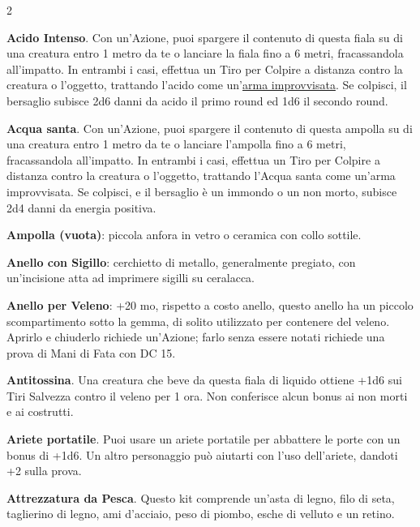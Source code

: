 \begin{multicols}{2}
\medskip

\textbf{Acido Intenso}\label{Acido Intenso}\hypertarget{Acido Intenso}{}. Con un'Azione, puoi spargere il contenuto di questa fiala su di una creatura entro 1 metro da te o lanciare la fiala fino a 6 metri, fracassandola all'impatto. In entrambi i casi, effettua un Tiro per Colpire a distanza contro la creatura o l'oggetto, trattando l'acido come un'\hyperlink{armaimprovvisata}{arma improvvisata}. Se colpisci, il bersaglio subisce 2d6 danni da acido il primo round ed 1d6 il secondo round.

\textbf{Acqua santa}\label{Acqua santa}\hypertarget{Acqua santa}{}. Con un'Azione, puoi spargere il contenuto di questa ampolla su di una creatura entro 1 metro da te o lanciare l'ampolla fino a 6 metri, fracassandola all'impatto. In entrambi i casi, effettua un Tiro per Colpire a distanza contro la creatura o l'oggetto, trattando l'Acqua santa come un'arma improvvisata. Se colpisci, e il bersaglio è un immondo o un non morto, subisce 2d4 danni da energia positiva.

\textbf{Ampolla (vuota)}: piccola anfora in vetro o ceramica con collo sottile.

\textbf{Anello con Sigillo}: cerchietto di metallo, generalmente pregiato, con un'incisione atta ad imprimere sigilli su ceralacca.

\textbf{Anello per Veleno}\label{Anello per veleno}\hypertarget{Anello per veleno}{}: +20 mo, rispetto a costo anello, questo anello ha un piccolo scompartimento sotto la gemma, di solito utilizzato per contenere del veleno. Aprirlo e chiuderlo richiede un'Azione; farlo senza essere notati richiede una prova di Mani di Fata con DC 15.

\textbf{Antitossina}\label{Antitossina}\hypertarget{Antitossina}{}. Una creatura che beve da questa fiala di liquido ottiene +1d6 sui Tiri Salvezza contro il veleno per 1 ora. Non conferisce alcun bonus ai non morti e ai costrutti.

\textbf{Ariete portatile}\label{Ariete portatile}\hypertarget{Ariete portatile}{}. Puoi usare un ariete portatile per abbattere le porte con un bonus di +1d6. Un altro personaggio può aiutarti con l'uso dell'ariete, dandoti +2 sulla prova.

\textbf{Attrezzatura da Pesca}. Questo kit comprende un'asta di legno, filo di seta, taglierino di legno, ami d'acciaio, peso di piombo, esche di velluto e un retino.


\end{multicols}
